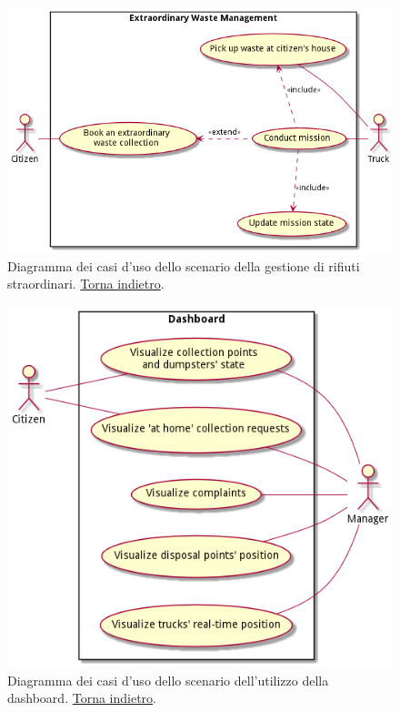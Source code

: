 \begin{figure}[H]
    \centering
    \includegraphics[width=\textwidth]{uml/extraordinary-management-use-cases.pm}
    \caption{Diagramma dei casi d'uso dello scenario della gestione di rifiuti straordinari. \hyperlink{back:uml/extraordinary-management-use-cases}{Torna indietro}.}
    \label{fig:uml/extraordinary-management-use-cases}
\end{figure}


\begin{figure}[H]
    \centering
    \includegraphics[width=\textwidth]{uml/dashboard-use-cases.pm}
    \caption{Diagramma dei casi d'uso dello scenario dell'utilizzo della dashboard. \hyperlink{back:uml/dashboard-use-cases}{Torna indietro}.}
    \label{fig:uml/dashboard-use-cases}
\end{figure}


